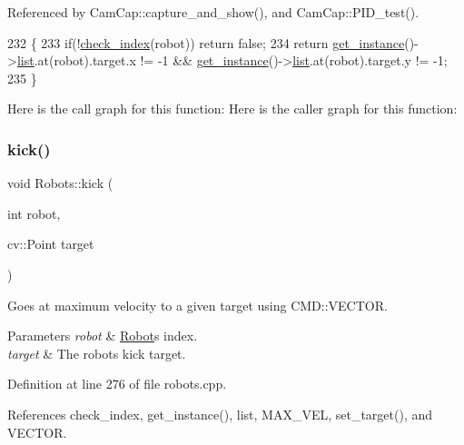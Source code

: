 Referenced by Cam\+Cap\+::capture\+\_\+and\+\_\+show(), and Cam\+Cap\+::\+P\+I\+D\+\_\+test().


\begin{DoxyCode}
232                                     \{
233     \textcolor{keywordflow}{if}(!\hyperlink{robots_8hpp_ae3e6ae8f87cdc750c0b99bc609d9ae43}{check\_index}(robot)) \textcolor{keywordflow}{return} \textcolor{keyword}{false};
234     \textcolor{keywordflow}{return} \hyperlink{class_robots_a589bce74db5f34af384952d48435168f}{get\_instance}()->\hyperlink{class_robots_a2c6b77265028f82a4342ca1ef15ed305}{list}.at(robot).target.x != -1 && 
      \hyperlink{class_robots_a589bce74db5f34af384952d48435168f}{get\_instance}()->\hyperlink{class_robots_a2c6b77265028f82a4342ca1ef15ed305}{list}.at(robot).target.y != -1;
235 \}
\end{DoxyCode}
Here is the call graph for this function\+:
Here is the caller graph for this function\+:
\mbox{\label{class_robots_afb5fa179562bd2f6f45c9231c2bbca88}} 
\subsubsection{\texorpdfstring{kick()}{kick()}}
{\footnotesize\ttfamily void Robots\+::kick (\begin{DoxyParamCaption}\item[{int}]{robot,  }\item[{cv\+::\+Point}]{target }\end{DoxyParamCaption})\hspace{0.3cm}{\ttfamily [static]}}

Goes at maximum velocity to a given target using C\+M\+D\+::\+V\+E\+C\+T\+OR. 
\begin{DoxyParams}{Parameters}
{\em robot} & \hyperlink{struct_robots_1_1_robot}{Robot}\textquotesingle{}s index. \\
\hline
{\em target} & The robot\textquotesingle{}s kick target. \\
\hline
\end{DoxyParams}


Definition at line 276 of file robots.\+cpp.



References check\+\_\+index, get\+\_\+instance(), list, M\+A\+X\+\_\+\+V\+EL, set\+\_\+target(), and V\+E\+C\+T\+OR.




